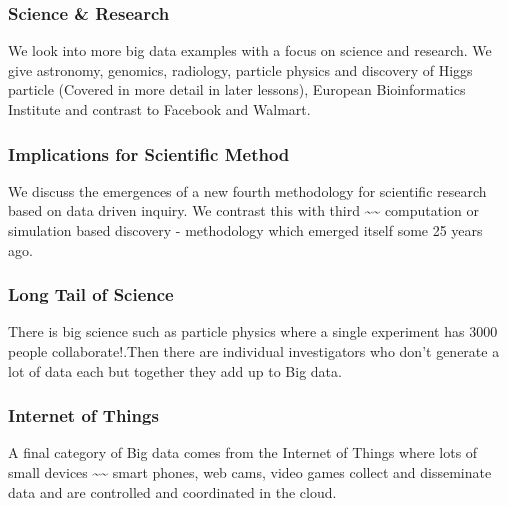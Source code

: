 

\subsubsection{Science \& Research}\label{science-research}

We look into more big data examples with a focus on science and
research. We give astronomy, genomics, radiology, particle physics and
discovery of Higgs particle (Covered in more detail in later lessons),
European Bioinformatics Institute and contrast to Facebook and Walmart.





\subsubsection{Implications for Scientific
Method}\label{implications-for-scientific-method}

We discuss the emergences of a new fourth methodology for scientific
research based on data driven inquiry. We contrast this with third
\textasciitilde{}\textasciitilde{} computation or simulation based
discovery - methodology which emerged itself some 25 years ago.



\subsubsection{Long Tail of Science}\label{long-tail-of-science}

There is big science such as particle physics where a single experiment
has 3000 people collaborate!.Then there are individual investigators who
don't generate a lot of data each but together they add up to Big data.



\subsubsection{Internet of Things}\label{internet-of-things}

A final category of Big data comes from the Internet of Things where
lots of small devices \textasciitilde{}\textasciitilde{} smart phones,
web cams, video games collect and disseminate data and are controlled
and coordinated in the cloud.


